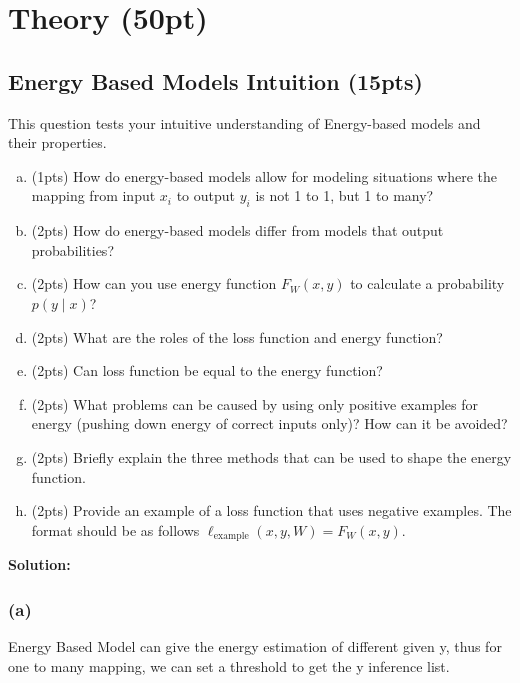 \section{Theory (50pt)}

\subsection{Energy Based Models Intuition (15pts) }
This question tests your intuitive understanding of Energy-based models and their properties. 
\begin{enumerate}[(a)]

\item (1pts) How do energy-based models allow for modeling situations where the mapping from input $x_i$ to output $y_i$ is not 1 to 1, but 1 to many?



\item (2pts) How do energy-based models differ from models that output probabilities?

\item  (2pts) How can you use energy function $F_W(x, y)$ to calculate a probability $p(y \mid x)$?

\item (2pts) What are the roles of the loss function and energy function? 

\item (2pts) Can loss function be equal to the energy function?

\item (2pts) What problems can be caused by using only positive examples for energy (pushing down energy of correct inputs only)? How can it be avoided?

\item 
(2pts) Briefly explain the three methods that can be used to shape the energy function.

\item (2pts) Provide an example of a loss function that uses negative examples. The format should be as follows $\ell_\text{example}(x, y, W) = F_W(x, y)$.

\end{enumerate}

\textbf{Solution:}

\subsubsection*{(a)}
Energy Based Model can give the energy estimation of different given y, thus for one to many mapping, we can set a threshold to get the y inference list.

